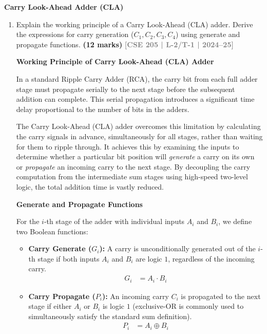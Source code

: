 \documentclass[12pt,a3paper]{article}
\newcommand{\yr}[1]{\hfill\textcolor{gray}{\small\textbf{[#1]}}}
\newcommand{\mk}[1]{\textcolor{orange!70!black}{\small\textbf{(#1 marks)}}}
\newcommand{\subtopic}[2]{%
  \vspace{10pt}
  \noindent\begin{tcolorbox}[colback=#1!8,colframe=#1,boxrule=0.6pt,arc=4pt,
    left=6pt,right=6pt,top=4pt,bottom=4pt]
    \small\bfseries\textcolor{#1}{#2}
  \end{tcolorbox}
  \vspace{2pt}
}
\begin{document}
\subtopic{cD}{Carry Look-Ahead Adder (CLA)}
\label{sub:s4-cla}

\begin{enumerate}

\item Explain the working principle of a Carry Look-Ahead (CLA) adder. Derive the expressions for carry generation ($C_1, C_2, C_3, C_4$) using generate and propagate functions.
\mk{12} \yr{CSE 205 | L-2/T-1 | 2024--25}

\begin{tcolorbox}[enhanced,breakable,ansbox,colback=cD!4,colframe=cD,boxrule=0.8pt,arc=5pt,title={\textbf{Answer}},fonttitle=\bfseries\color{white},colbacktitle=cD]

\textbf{Working Principle of Carry Look-Ahead (CLA) Adder}
\vspace{0.5em}

In a standard Ripple Carry Adder (RCA), the carry bit from each full adder stage must propagate serially to the next stage before the subsequent addition can complete. This serial propagation introduces a significant time delay proportional to the number of bits in the adders. 

The Carry Look-Ahead (CLA) adder overcomes this limitation by calculating the carry signals in advance, simultaneously for all stages, rather than waiting for them to ripple through. It achieves this by examining the inputs to determine whether a particular bit position will \textit{generate} a carry on its own or \textit{propagate} an incoming carry to the next stage. By decoupling the carry computation from the intermediate sum stages using high-speed two-level logic, the total addition time is vastly reduced.

\vspace{1em}
\textbf{Generate and Propagate Functions}
\vspace{0.5em}

For the $i$-th stage of the adder with individual inputs $A_i$ and $B_i$, we define two Boolean functions:
\begin{itemize}
    \item \textbf{Carry Generate ($G_i$):} A carry is unconditionally generated out of the $i$-th stage if both inputs $A_i$ and $B_i$ are logic $1$, regardless of the incoming carry.
    \begin{align*}
        G_i &= A_i \cdot B_i
    \end{align*}
    \item \textbf{Carry Propagate ($P_i$):} An incoming carry $C_i$ is propagated to the next stage if either $A_i$ or $B_i$ is logic $1$ (exclusive-OR is commonly used to simultaneously satisfy the standard sum definition).
    \begin{align*}
        P_i &= A_i \oplus B_i
    \end{align*}
\end{itemize}


\end{tcolorbox}
\end{enumerate}
\end{document}
